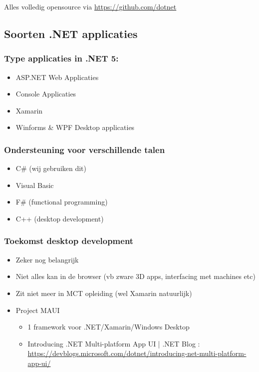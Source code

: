\documentclass{article}
\begin{document}
Alles volledig opensource via \url{https://github.com/dotnet}

\subsection{Soorten .NET applicaties}

\subsubsection{Type applicaties in .NET 5:}

\begin{itemize}
    \item ASP.NET Web Applicaties
    \item Console Applicaties
    \item Xamarin
    \item Winforms \& WPF Desktop applicaties
\end{itemize}

\subsubsection{Ondersteuning voor verschillende talen}

\begin{itemize}
    \item C\# (wij gebruiken dit)
    \item Visual Basic
    \item F\# (functional programming)
    \item C++ (desktop development)
\end{itemize}

\subsubsection{Toekomst desktop development}

\begin{itemize}
    \item Zeker nog belangrijk
    \item Niet alles kan in de browser (vb zware 3D apps, interfacing met machines etc)
    \item Zit niet meer in MCT opleiding (wel Xamarin natuurlijk)
    \item Project MAUI
    \begin{itemize}
        \item 1 framework voor .NET/Xamarin/Windows Desktop
        \item Introducing .NET Multi-platform App UI | .NET Blog : \url{https://devblogs.microsoft.com/dotnet/introducing-net-multi-platform-app-ui/}
    \end{itemize}
\end{itemize}
\end{document}
